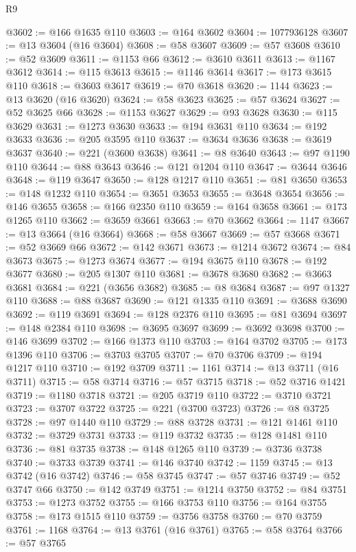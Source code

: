 \begin{lexlean}{R9}
\begin{coremodule}
@3602 := @166 @1635 @110
@3603 := @164 @3602
@3604 := 1077936128
@3607 := @13 @3604 (@16 @3604)
@3608 := @58 @3607
@3609 := @57 @3608
@3610 := @52 @3609
@3611 := @1153 @66
@3612 := @3610 @3611
@3613 := @1167 @3612
@3614 := @115 @3613
@3615 := @1146 @3614
@3617 := @173 @3615 @110
@3618 := @3603 @3617
@3619 := @70 @3618
@3620 := 1144
@3623 := @13 @3620 (@16 @3620)
@3624 := @58 @3623
@3625 := @57 @3624
@3627 := @52 @3625 @66
@3628 := @1153 @3627
@3629 := @93 @3628
@3630 := @115 @3629
@3631 := @1273 @3630
@3633 := @194 @3631 @110
@3634 := @192 @3633
@3636 := @205 @3595 @110
@3637 := @3634 @3636
@3638 := @3619 @3637
@3640 := @221 (@3600 @3638)
@3641 := @8 @3640
@3643 := @97 @1190 @110
@3644 := @88 @3643
@3646 := @121 @1204 @110
@3647 := @3644 @3646
@3648 := @119 @3647
@3650 := @128 @1217 @110
@3651 := @81 @3650
@3653 := @148 @1232 @110
@3654 := @3651 @3653
@3655 := @3648 @3654
@3656 := @146 @3655
@3658 := @166 @2350 @110
@3659 := @164 @3658
@3661 := @173 @1265 @110
@3662 := @3659 @3661
@3663 := @70 @3662
@3664 := 1147
@3667 := @13 @3664 (@16 @3664)
@3668 := @58 @3667
@3669 := @57 @3668
@3671 := @52 @3669 @66
@3672 := @142 @3671
@3673 := @1214 @3672
@3674 := @84 @3673
@3675 := @1273 @3674
@3677 := @194 @3675 @110
@3678 := @192 @3677
@3680 := @205 @1307 @110
@3681 := @3678 @3680
@3682 := @3663 @3681
@3684 := @221 (@3656 @3682)
@3685 := @8 @3684
@3687 := @97 @1327 @110
@3688 := @88 @3687
@3690 := @121 @1335 @110
@3691 := @3688 @3690
@3692 := @119 @3691
@3694 := @128 @2376 @110
@3695 := @81 @3694
@3697 := @148 @2384 @110
@3698 := @3695 @3697
@3699 := @3692 @3698
@3700 := @146 @3699
@3702 := @166 @1373 @110
@3703 := @164 @3702
@3705 := @173 @1396 @110
@3706 := @3703 @3705
@3707 := @70 @3706
@3709 := @194 @1217 @110
@3710 := @192 @3709
@3711 := 1161
@3714 := @13 @3711 (@16 @3711)
@3715 := @58 @3714
@3716 := @57 @3715
@3718 := @52 @3716 @1421
@3719 := @1180 @3718
@3721 := @205 @3719 @110
@3722 := @3710 @3721
@3723 := @3707 @3722
@3725 := @221 (@3700 @3723)
@3726 := @8 @3725
@3728 := @97 @1440 @110
@3729 := @88 @3728
@3731 := @121 @1461 @110
@3732 := @3729 @3731
@3733 := @119 @3732
@3735 := @128 @1481 @110
@3736 := @81 @3735
@3738 := @148 @1265 @110
@3739 := @3736 @3738
@3740 := @3733 @3739
@3741 := @146 @3740
@3742 := 1159
@3745 := @13 @3742 (@16 @3742)
@3746 := @58 @3745
@3747 := @57 @3746
@3749 := @52 @3747 @66
@3750 := @142 @3749
@3751 := @1214 @3750
@3752 := @84 @3751
@3753 := @1273 @3752
@3755 := @166 @3753 @110
@3756 := @164 @3755
@3758 := @173 @1515 @110
@3759 := @3756 @3758
@3760 := @70 @3759
@3761 := 1168
@3764 := @13 @3761 (@16 @3761)
@3765 := @58 @3764
@3766 := @57 @3765

\end{coremodule}
\end{lexlean}
